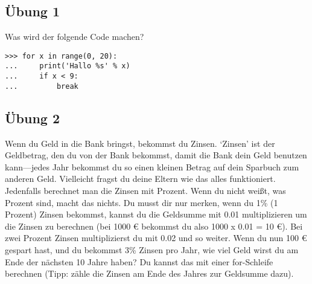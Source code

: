 \subsection*{Übung 1}
Was wird der folgende Code machen?

\begin{Verbatim}[frame=single]
>>> for x in range(0, 20):
...     print('Hallo %s' % x)
...     if x < 9:
...         break
\end{Verbatim}



\subsection*{Übung 2}
Wenn du Geld in die Bank bringst, bekommst du Zinsen. `Zinsen' ist der Geldbetrag, den du von der Bank bekommst, damit die Bank dein Geld benutzen kann---jedes Jahr bekommst du so einen kleinen Betrag auf dein Sparbuch zum anderen Geld. Vielleicht fragst du deine Eltern wie das alles funktioniert.
Jedenfalls berechnet man die Zinsen mit Prozent. Wenn du nicht weißt, was Prozent sind, macht das nichts. Du musst dir nur merken, wenn du 1\% (1 Prozent) Zinsen bekommst, kannst du die Geldsumme mit 0.01 multiplizieren um die Zinsen zu berechnen (bei 1000 € bekommst du also 1000 x 0.01 = 10 €). Bei zwei Prozent Zinsen multiplizierst du mit 0.02 und so weiter.
Wenn du nun 100 € gespart hast, und du bekommst 3\% Zinsen pro Jahr, wie viel Geld wirst du am Ende der nächsten 10 Jahre haben? Du kannst das mit einer for-Schleife berechnen (Tipp: zähle die Zinsen am Ende des Jahres zur Geldsumme dazu).
\newpage
